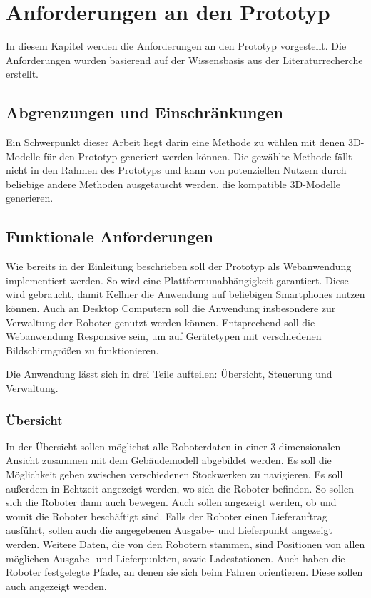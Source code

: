 \newpage
\section{Anforderungen an den Prototyp}
In diesem Kapitel werden die Anforderungen an den Prototyp vorgestellt. Die Anforderungen wurden basierend auf der Wissensbasis aus der Literaturrecherche erstellt.

\subsection{Abgrenzungen und Einschränkungen}

Ein Schwerpunkt dieser Arbeit liegt darin eine Methode zu wählen mit denen 3D-Modelle für den Prototyp generiert werden können. Die gewählte Methode fällt nicht in den Rahmen des Prototyps und kann von potenziellen Nutzern durch beliebige andere Methoden ausgetauscht werden, die kompatible 3D-Modelle generieren.

\subsection{Funktionale Anforderungen}

Wie bereits in der Einleitung beschrieben soll der Prototyp als Webanwendung implementiert werden. So wird eine Plattformunabhängigkeit garantiert. Diese wird gebraucht, damit Kellner die Anwendung auf beliebigen Smartphones nutzen können. Auch an Desktop Computern soll die Anwendung insbesondere zur Verwaltung der Roboter genutzt werden können. Entsprechend soll die Webanwendung Responsive sein, um auf Gerätetypen mit verschiedenen Bildschirmgrößen zu funktionieren.

Die Anwendung lässt sich in drei Teile aufteilen: Übersicht, Steuerung und Verwaltung.

\subsubsection{Übersicht}

In der Übersicht sollen möglichst alle Roboterdaten in einer 3-dimensionalen Ansicht zusammen mit dem Gebäudemodell abgebildet werden. Es soll die Möglichkeit geben zwischen verschiedenen Stockwerken zu navigieren. Es soll außerdem in Echtzeit angezeigt werden, wo sich die Roboter befinden. So sollen sich die Roboter dann auch bewegen. Auch sollen angezeigt werden, ob und womit die Roboter beschäftigt sind. Falls der Roboter einen Lieferauftrag ausführt, sollen auch die angegebenen Ausgabe- und Lieferpunkt angezeigt werden. Weitere Daten, die von den Robotern stammen, sind Positionen von allen möglichen Ausgabe- und Lieferpunkten, sowie Ladestationen. Auch haben die Roboter festgelegte Pfade, an denen sie sich beim Fahren  orientieren. Diese sollen auch angezeigt werden.

